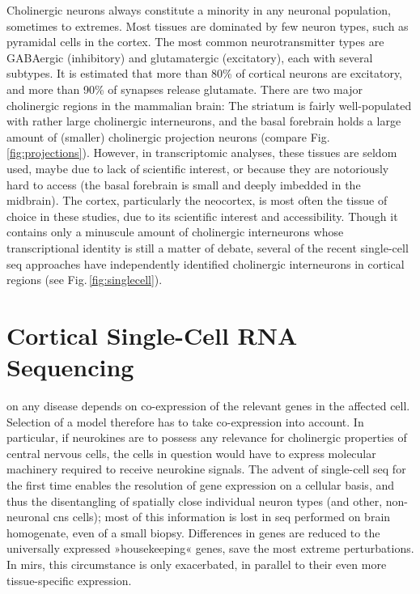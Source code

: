 Cholinergic neurons always constitute a minority in any neuronal population, sometimes to extremes. Most tissues are dominated by few neuron types, such as pyramidal cells in the cortex. The most common neurotransmitter types are GABAergic (inhibitory) and glutamatergic (excitatory), each with several subtypes. It is estimated that more than 80\% of cortical neurons are excitatory, and more than 90\% of synapses release glutamate\cite{Raichle2002}. There are two major cholinergic regions in the mammalian brain: The striatum is fairly well-populated with rather large cholinergic interneurons, and the basal forebrain holds a large amount of (smaller) cholinergic projection neurons (compare Fig.\,\ref{fig:projections}). However, in transcriptomic analyses, these tissues are seldom used, maybe due to lack of scientific interest, or because they are notoriously hard to access (the basal forebrain is small and deeply imbedded in the midbrain). The cortex, particularly the neocortex, is most often the tissue of choice in these studies, due to its scientific interest and accessibility. Though it contains only a minuscule amount of cholinergic interneurons whose transcriptional identity is still a matter of debate, several of the recent single-cell \ac{seq} approaches have independently identified cholinergic interneurons in cortical regions (see Fig.\,\ref{fig:singlecell}).

\section{Cortical Single-Cell RNA Sequencing}
 on any disease depends on co-expression of the relevant genes in the affected cell. Selection of a model therefore has to take co-expression into account. In particular, if neurokines are to possess any relevance for cholinergic properties of central nervous cells, the cells in question would have to express molecular machinery required to receive neurokine signals. The advent of single-cell \ac{seq} for the first time enables the resolution of gene expression on a cellular basis, and thus the disentangling of spatially close individual neuron types (and other, non-neuronal \ac{cns} cells); most of this information is lost in \ac{seq} performed on brain homogenate, even of a small biopsy. Differences in genes are reduced to the universally expressed »housekeeping« genes, save the most extreme perturbations. In \acp{mir}, this circumstance is only exacerbated, in parallel to their even more tissue-specific expression.

